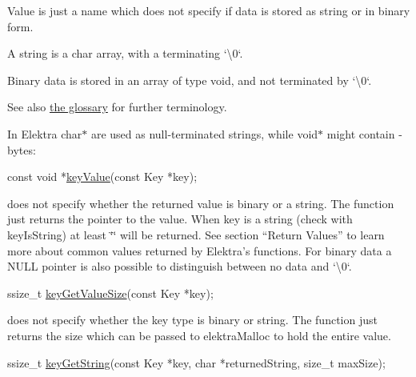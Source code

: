 \begin{DoxyItemize}
\item Value is just a name which does not specify if data is stored as string or in binary form.
\item A string is a char array, with a terminating `\textquotesingle{}\textbackslash{}0\textquotesingle{}`.
\item Binary data is stored in an array of type void, and not terminated by `\textquotesingle{}\textbackslash{}0\textquotesingle{}`.
\end{DoxyItemize}

See also \hyperlink{doc_help_elektra-glossary_md}{the glossary} for further terminology.

In Elektra {\ttfamily char$\ast$} are used as null-\/terminated strings, while {\ttfamily void$\ast$} might contain {}-\/bytes\+:


\begin{DoxyCode}
\textcolor{keyword}{const} \textcolor{keywordtype}{void} *\hyperlink{group__keyvalue_ga6f29609c5da53c6dc26a98678d5752af}{keyValue}(\textcolor{keyword}{const} Key *key);
\end{DoxyCode}


does not specify whether the returned value is binary or a string. The function just returns the pointer to the value. When {\ttfamily key} is a string (check with {\ttfamily key\+Is\+String}) at least {\ttfamily \char`\"{}\char`\"{}} will be returned. See section “\+Return Values” to learn more about common values returned by Elektra’s functions. For binary data a {\ttfamily N\+U\+LL} pointer is also possible to distinguish between no data and `\textquotesingle{}\textbackslash{}0\textquotesingle{}`.


\begin{DoxyCode}
ssize\_t \hyperlink{group__keyvalue_gae326672fffb7474abfe9baf53b73217e}{keyGetValueSize}(\textcolor{keyword}{const} Key *key);
\end{DoxyCode}


does not specify whether the key type is binary or string. The function just returns the size which can be passed to {\ttfamily elektra\+Malloc} to hold the entire value.


\begin{DoxyCode}
ssize\_t \hyperlink{group__keyvalue_ga41b9fac5ccddafe407fc0ae1e2eb8778}{keyGetString}(\textcolor{keyword}{const} Key *key, \textcolor{keywordtype}{char} *returnedString, \textcolor{keywordtype}{size\_t} maxSize);
\end{DoxyCode}


